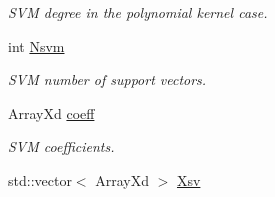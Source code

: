 \begin{DoxyCompactItemize}
\begin{DoxyCompactList}\small\item\em S\-V\-M degree in the polynomial kernel case. \end{DoxyCompactList}\item 
int \hyperlink{class_go_s_u_m_1_1_c_single_a_m_ab2258ece370c0d08b80c3031c67f559e}{Nsvm}
\begin{DoxyCompactList}\small\item\em S\-V\-M number of support vectors. \end{DoxyCompactList}\item 
Array\-Xd \hyperlink{class_go_s_u_m_1_1_c_single_a_m_a9000684635e196782000bb3f6cfb7d29}{coeff}
\begin{DoxyCompactList}\small\item\em S\-V\-M coefficients. \end{DoxyCompactList}\item 
std\-::vector$<$ Array\-Xd $>$ \hyperlink{class_go_s_u_m_1_1_c_single_a_m_ad000e314359f2cdfef4b671d93afedbe}{Xsv}
\end{DoxyCompactItemize}
